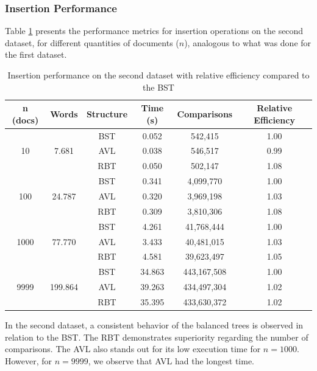  \subsubsection{Insertion Performance}

 Table \ref{tab:insercao_db2} presents the performance metrics for insertion operations on the second dataset,
 for different quantities of documents ($n$), analogous to what was done for the first dataset.

 \begin{table}[H]
     \centering
     \begin{tabular}{|c|c|c|c|c|c|}
     \hline
     \textbf{n (docs)} & \textbf{Words} & \textbf{Structure} & \textbf{Time (s)} & \textbf{Comparisons} & \textbf{Relative Efficiency} \\
     \hline
     \multirow{3}{*}{10} & \multirow{3}{*}{7.681} & BST & 0.052 & 542,415 & 1.00 \\
     & & AVL & 0.038 & 546,517 & 0.99 \\
     & & RBT & 0.050 & 502,147 & 1.08 \\
     \hline
     \multirow{3}{*}{100} & \multirow{3}{*}{24.787} & BST & 0.341 & 4,099,770 & 1.00 \\
     & & AVL & 0.320 & 3,969,198 & 1.03 \\
     & & RBT & 0.309 & 3,810,306 & 1.08 \\
     \hline
     \multirow{3}{*}{1000} & \multirow{3}{*}{77.770} & BST & 4.261 & 41,768,444 & 1.00 \\
     & & AVL & 3.433 & 40,481,015 & 1.03 \\
     & & RBT & 4.581 & 39,623,497 & 1.05 \\
     \hline
     \multirow{3}{*}{9999} & \multirow{3}{*}{199.864} & BST & 34.863 & 443,167,508 & 1.00 \\
     & & AVL & 39.263 & 434,497,304 & 1.02 \\
     & & RBT & 35.395 & 433,630,372 & 1.02 \\
     \hline 
     \end{tabular}
     \caption{Insertion performance on the second dataset with relative efficiency compared to the BST}
     \label{tab:insercao_db2}
 \end{table}


 In the second dataset, a consistent behavior of the balanced trees is observed in relation to the BST.
 The RBT demonstrates superiority regarding the number of comparisons. The AVL also stands out for its low execution
 time for $n = 1000$. However, for $n = 9999$, we observe that AVL had the longest time.

